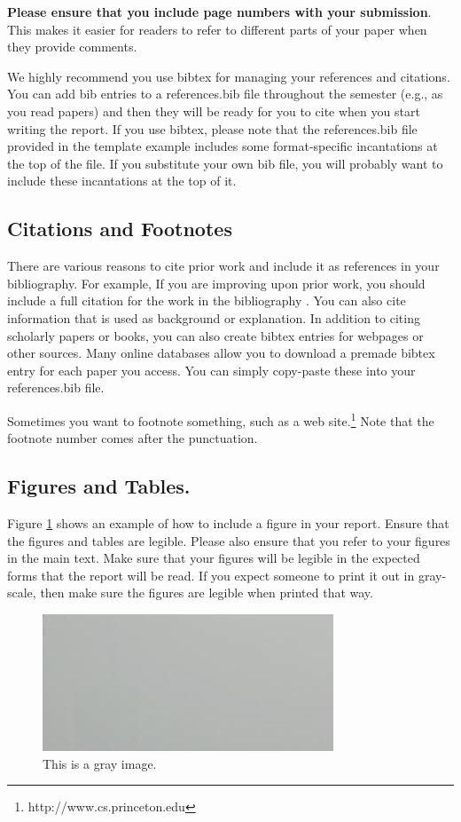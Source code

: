 \documentclass[pageno]{jpaper}
\begin{document}
\textbf{Please ensure that you include page numbers with your
	submission}. This makes it easier for readers to refer to
different parts of your paper when they provide comments.

We highly recommend you use bibtex for managing your references and citations.  You can add bib entries to a references.bib file throughout the semester (e.g., as you read papers) and then they will be ready for you to cite when you start writing the report.  If you use bibtex, please note that the references.bib file provided in the template example includes some format-specific incantations at the top of the file.  If you substitute your own bib file, you will probably want to include these 
incantations at the top of it.

\subsection{Citations and Footnotes}

There are various reasons to cite prior work and include it as references in your bibliography.  For example, If you are improving upon 
prior work, you should include
a full citation for the work in the bibliography \cite{nicepaper,nicepaper2}. 
You can also cite information that is used as background or
explanation\cite{Salzberg:2005}.  In addition to citing scholarly papers or books, you can
also create bibtex entries for webpages or other sources.  Many online
databases allow you to download a premade bibtex entry for each paper
you access.  You can simply copy-paste these into your references.bib
file.

Sometimes you want to footnote something, such as a web
site.\footnote{http://www.cs.princeton.edu}  Note that the footnote
number comes after the punctuation.

\subsection{Figures and Tables.}

Figure \ref{fig:gray} shows an example of how to include a figure in
your report.  
Ensure that the figures and
tables are legible.  Please also ensure that you refer to your
figures in the main text. Make sure that your figures will be legible
in the expected forms that the report will be read.  If you expect someone
to print it out in gray-scale, then make sure the figures are legible 
when printed that way.  

\begin{figure}[hbt]
	\centering
	\includegraphics[width=0.75\linewidth]{gray.jpg}
	\caption{This is a gray image.}
	\label{fig:gray}
\end{figure}
\end{document}
